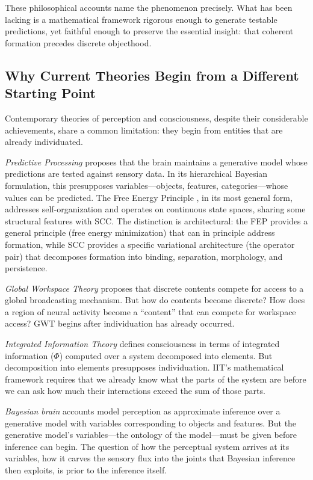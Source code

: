 \documentclass[lettersize,journal]{IEEEtran}
\begin{document}
These philosophical accounts name the phenomenon precisely. What has been lacking is a mathematical framework rigorous enough to generate testable predictions, yet faithful enough to preserve the essential insight: that coherent formation precedes discrete objecthood.

\subsection{Why Current Theories Begin from a Different Starting Point}

Contemporary theories of perception and consciousness, despite their considerable achievements, share a common limitation: they begin from entities that are already individuated.

\emph{Predictive Processing} \cite{clark2013whatever,friston2010free} proposes that the brain maintains a generative model whose predictions are tested against sensory data. In its hierarchical Bayesian formulation, this presupposes variables---objects, features, categories---whose values can be predicted. The Free Energy Principle \cite{friston2010free}, in its most general form, addresses self-organization and operates on continuous state spaces, sharing some structural features with SCC. The distinction is architectural: the FEP provides a general principle (free energy minimization) that can in principle address formation, while SCC provides a specific variational architecture (the operator pair) that decomposes formation into binding, separation, morphology, and persistence.

\emph{Global Workspace Theory} \cite{baars1988cognitive,dehaene2011experimental} proposes that discrete contents compete for access to a global broadcasting mechanism. But how do contents become discrete? How does a region of neural activity become a ``content'' that can compete for workspace access? GWT begins after individuation has already occurred.

\emph{Integrated Information Theory} \cite{tononi2004information,oizumi2014phenomenology} defines consciousness in terms of integrated information ($\Phi$) computed over a system decomposed into elements. But decomposition into elements presupposes individuation. IIT's mathematical framework requires that we already know what the parts of the system are before we can ask how much their interactions exceed the sum of those parts.

\emph{Bayesian brain} accounts \cite{knill2004bayesian,lee2003hierarchical} model perception as approximate inference over a generative model with variables corresponding to objects and features. But the generative model's variables---the ontology of the model---must be given before inference can begin. The question of how the perceptual system arrives at its variables, how it carves the sensory flux into the joints that Bayesian inference then exploits, is prior to the inference itself.
\end{document}
